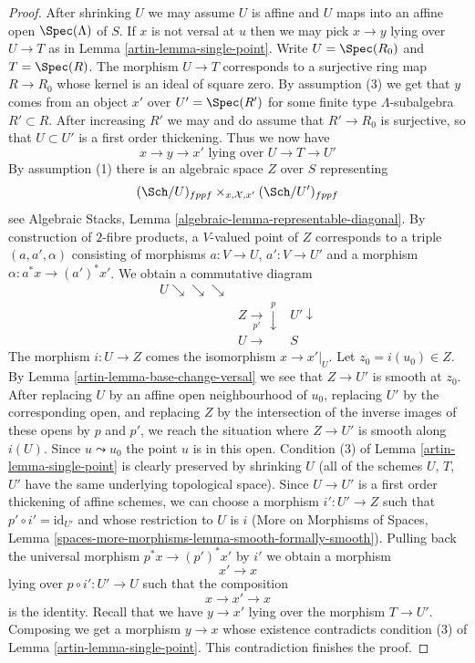 \begin{proof}

After shrinking $U$ we may assume $U$ is affine and $U$ maps into an
affine open $\Spec(\Lambda)$ of $S$. If $x$ is not versal at $u$ then
we may pick $x \to y$ lying over $U \to T$ as in
Lemma \ref{artin-lemma-single-point}. Write $U = \Spec(R_0)$ and $T = \Spec(R)$.
The morphism $U \to T$ corresponds to a surjective ring map
$R \to R_0$ whose kernel is an ideal of square zero.
By assumption (3) we get that $y$ comes from an object $x'$ over
$U' = \Spec(R')$ for some finite type $\Lambda$-subalgebra
$R' \subset R$. After increasing $R'$ we may and do assume that
$R' \to R_0$ is surjective, so that $U \subset U'$ is a first order thickening.
Thus we now have
$$
x \to y \to x'
\text{ lying over }
U \to T \to U'
$$
By assumption (1) there is an algebraic space $Z$ over $S$ representing
$$
(\Sch/U)_{fppf} \times_{x, \mathcal{X}, x'} (\Sch/U')_{fppf}
$$
see Algebraic Stacks, Lemma \ref{algebraic-lemma-representable-diagonal}.
By construction of $2$-fibre products, a $V$-valued point of $Z$
corresponds to a triple $(a, a', \alpha)$ consisting of morphisms
$a : V \to U$, $a' : V \to U'$ and a morphism $\alpha : a^*x \to (a')^*x'$.
We obtain a commutative diagram
$$
\begin{array}{ccc}U \searrow\searrow\searrow &  &  \\  & Z \underset{p'}{\longrightarrow}\overset{p}{\downarrow} & U' \downarrow \\  & U \longrightarrow & S\end{array}
$$
The morphism $i : U \to Z$ comes the isomorphism $x \to x'|_U$.
Let $z_0 = i(u_0) \in Z$. By Lemma \ref{artin-lemma-base-change-versal}
we see that $Z \to U'$ is smooth at $z_0$. After replacing $U$ by an
affine open neighbourhood of $u_0$, replacing $U'$ by the corresponding
open, and replacing $Z$ by the intersection of the inverse images
of these opens by $p$ and $p'$, we reach the situation where
$Z \to U'$ is smooth along $i(U)$. Since $u \leadsto u_0$ the point
$u$ is in this open. Condition (3) of Lemma \ref{artin-lemma-single-point}
is clearly preserved by shrinking $U$ (all of the schemes $U$, $T$, $U'$
have the same underlying topological space).
Since $U \to U'$ is a first order thickening of affine schemes,
we can choose a morphism $i' : U' \to Z$
such that $p' \circ i' = \text{id}_{U'}$ and
whose restriction to $U$ is $i$
(More on Morphisms of Spaces, Lemma
\ref{spaces-more-morphisms-lemma-smooth-formally-smooth}).
Pulling back the universal morphism $p^*x \to (p')^*x'$ by $i'$
we obtain a morphism
$$
x' \to x
$$
lying over $p \circ i' : U' \to U$ such that the composition
$$
x \to x' \to x
$$
is the identity. Recall that we have $y \to x'$ lying over
the morphism $T \to U'$. Composing we get a morphism
$y \to x$ whose existence contradicts condition
(3) of Lemma \ref{artin-lemma-single-point}.
This contradiction finishes the proof.
\end{proof}


